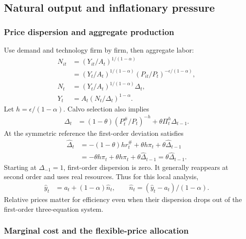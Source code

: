 \subsection{Natural output and inflationary pressure}

\subsubsection{Price dispersion and aggregate production}

Use demand and technology firm by firm, then aggregate labor:
\begin{align}
 N_{it}&=(Y_{it}/A_t)^{1/(1-\alpha)}\\
 &=(Y_t/A_t)^{1/(1-\alpha)}
                       (P_{it}/P_t)^{-\epsilon/(1-\alpha)},\\
 N_t&=(Y_t/A_t)^{1/(1-\alpha)}\Delta_t,\\
 Y_t&=A_t(N_t/\Delta_t)^{1-\alpha}.
\end{align}
Let $h=\epsilon/(1-\alpha)$. Calvo selection also implies
\begin{align}
 \Delta_t&=(1-\theta)(P_t^{\#}/P_t)^{-h}
                   +\theta\Pi_t^h\Delta_{t-1}.
\end{align}
At the symmetric reference the first-order deviation satisfies
\begin{align}
 \hat\Delta_t&=-(1-\theta)h r_t^{\#}
                         +\theta h\pi_t+\theta\hat\Delta_{t-1}\\
 &=-\theta h\pi_t+\theta h\pi_t+\theta\hat\Delta_{t-1}
 =\theta\hat\Delta_{t-1}.
\end{align}
Starting at $\Delta_{-1}=1$, first-order dispersion is zero. It generally
reappears at second order and uses real resources. Thus for this local analysis,
\begin{align}
 \hat y_t&=a_t+(1-\alpha)\hat n_t,\qquad
 \hat n_t=(\hat y_t-a_t)/(1-\alpha).
 \label{eq:nk-local-production}
\end{align}
Relative prices matter for efficiency even when their dispersion drops out of
the first-order three-equation system.

\subsubsection{Marginal cost and the flexible-price allocation}

